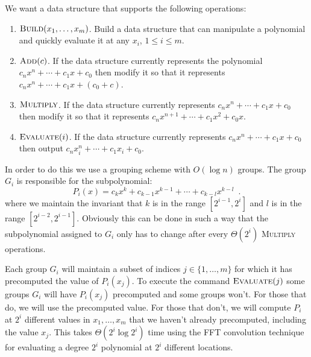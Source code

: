 \documentclass[lotsofwhite]{patmorin}
\begin{document}
We want a data structure that supports the following operations:

\begin{enumerate}
\item $\textsc{Build}(x_1,\ldots,x_m)$.  Build a data structure that
can manipulate a polynomial and quickly evaluate it at any $x_i$,
$1\le i\le m$.

\item $\textsc{Add}(c)$.  If the data structure currently represents
the polynomial $c_nx^n+\cdots+c_1x+c_0$ then modify it so that it
represents $c_nx^n+\cdots+c_1x+(c_0+c)$.

\item $\textsc{Multiply}$.  If the data structure currently represents
$c_nx^n+\cdots+c_1x+c_0$ then modify it so that it represents
$c_nx^{n+1}+\cdots+c_1x^2+c_0x$.

\item $\textsc{Evaluate}(i)$.  If the data structure currently
represents $c_nx^n+\cdots+c_1x+c_0$ then output $c_nx_i^n+\cdots
+c_1x_i+c_0$.
\end{enumerate}

In order to do this we use a grouping scheme with $O(\log n)$ groups.
The group $G_i$ is responsible for the subpolynomial:
\[
    P_i(x) =c_kx^k + c_{k-1}x^{k-1} + \cdots + c_{k-l}x^{k-l}  \enspace .
\]
where we maintain the invariant that $k$ is in the range
$[2^{i-1},2^{i}]$ and $l$ is in the range $[2^{i-2},2^{i-1}]$.
Obviously this can be done in such a way that the subpolynomial
assigned to $G_i$ only has to change after every $\Theta(2^{i})$
\textsc{Multiply} operations.

Each group $G_i$ will maintain a subset of indices
$j\in\{1,\ldots,m\}$ for which it has precomputed the value of
$P_i(x_j)$.  To execute the command $\textsc{Evaluate}(j)$ some groups
$G_i$ will have $P_i(x_j)$ precomputed and some groups won't.  For
those that do, we will use the precomputed value.  For those that
don't, we will compute $P_i$ at $2^i$ different values in
$x_1,\ldots,x_m$ that we haven't already precomputed, including the
value $x_j$.  This takes $\Theta(2^i\log 2^i)$ time using the FFT
convolution technique for evaluating a degree $2^i$ polynomial at
$2^i$ different locations.
\end{document}

